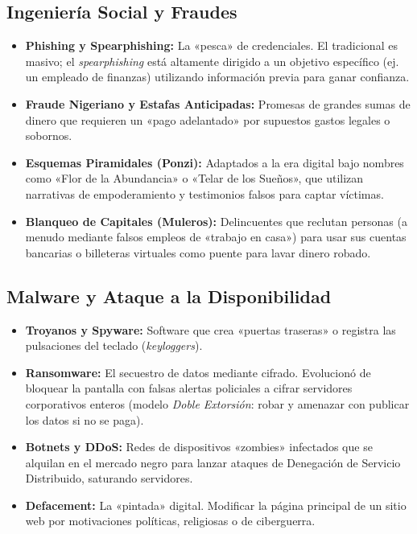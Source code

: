 \documentclass[11pt,a4paper]{article}
\begin{document}
\subsection{Ingeniería Social y Fraudes}
\begin{itemize}[leftmargin=*]
  \item \textbf{Phishing y Spearphishing:} La «pesca» de credenciales. El tradicional es masivo; el \textit{spearphishing} está altamente dirigido a un objetivo específico (ej. un empleado de finanzas) utilizando información previa para ganar confianza.
  \item \textbf{Fraude Nigeriano y Estafas Anticipadas:} Promesas de grandes sumas de dinero que requieren un «pago adelantado» por supuestos gastos legales o sobornos.
  \item \textbf{Esquemas Piramidales (Ponzi):} Adaptados a la era digital bajo nombres como «Flor de la Abundancia» o «Telar de los Sueños», que utilizan narrativas de empoderamiento y testimonios falsos para captar víctimas.
  \item \textbf{Blanqueo de Capitales (Muleros):} Delincuentes que reclutan personas (a menudo mediante falsos empleos de «trabajo en casa») para usar sus cuentas bancarias o billeteras virtuales como puente para lavar dinero robado.
\end{itemize}

\subsection{Malware y Ataque a la Disponibilidad}
\begin{itemize}[leftmargin=*]
  \item \textbf{Troyanos y Spyware:} Software que crea «puertas traseras» o registra las pulsaciones del teclado (\textit{keyloggers}).
  \item \textbf{Ransomware:} El secuestro de datos mediante cifrado. Evolucionó de bloquear la pantalla con falsas alertas policiales a cifrar servidores corporativos enteros (modelo \textit{Doble Extorsión}: robar y amenazar con publicar los datos si no se paga).
  \item \textbf{Botnets y DDoS:} Redes de dispositivos «zombies» infectados que se alquilan en el mercado negro para lanzar ataques de Denegación de Servicio Distribuido, saturando servidores.
  \item \textbf{Defacement:} La «pintada» digital. Modificar la página principal de un sitio web por motivaciones políticas, religiosas o de ciberguerra.
\end{itemize}
\end{document}

